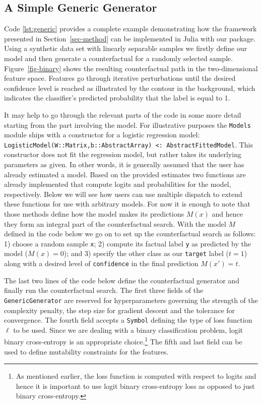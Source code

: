 \documentclass{juliacon}
\begin{document}
\hypertarget{a-simple-generic-generator}{%
\subsection{A Simple Generic
Generator}\label{a-simple-generic-generator}}

Code \ref{lst:generic} provides a complete example demonstrating how the
framework presented in Section~\ref{sec-method} can be implemented in
Julia with our package. Using a synthetic data set with linearly
separable samples we firstly define our model and then generate a
counterfactual for a randomly selected sample. Figure~\ref{fig-binary}
shows the resulting counterfactual path in the two-dimensional feature
space. Features go through iterative perturbations until the desired
confidence level is reached as illustrated by the contour in the
background, which indicates the classifier's predicted probability that
the label is equal to 1.

It may help to go through the relevant parts of the code in some more
detail starting from the part involving the model. For illustrative
purposes the \texttt{Models} module ships with a constructor for a
logistic regression model:
\texttt{LogisticModel(W::Matrix,b::AbstractArray)\ \textless{}:\ AbstractFittedModel}.
This constructor does not fit the regression model, but rather takes its
underlying parameters as given. In other words, it is generally assumed
that the user has already estimated a model. Based on the provided
estimates two functions are already implemented that compute logits and
probabilities for the model, respectively. Below we will see how users
can use multiple dispatch to extend these functions for use with
arbitrary models. For now it is enough to note that those methods define
how the model makes its predictions \(M(x)\) and hence they form an
integral part of the counterfactual search. With the model \(M\) defined
in the code below we go on to set up the counterfactual search as
follows: 1) choose a random sample \texttt{x}; 2) compute its factual
label \texttt{y} as predicted by the model (\(M(x)=0\)); and 3) specify
the other class as our \texttt{target} label (\(t=1\)) along with a
desired level of \texttt{confidence} in the final prediction
\(M(x\prime)=t\).

The last two lines of the code below define the counterfactual generator
and finally run the counterfactual search. The first three fields of the
\texttt{GenericGenerator} are reserved for hyperparameters governing the
strength of the complexity penalty, the step size for gradient descent
and the tolerance for convergence. The fourth field accepts a
\texttt{Symbol} defining the type of loss function \(\ell\) to be used.
Since we are dealing with a binary classification problem, logit binary
cross-entropy is an appropriate choice.\footnote{As mentioned earlier,
  the loss function is computed with respect to logits and hence it is
  important to use logit binary cross-entropy loss as opposed to just
  binary cross-entropy.} The fifth and last field can be used to define
mutability constraints for the features.
\end{document}
